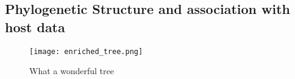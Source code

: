 \subsection*{Phylogenetic Structure and association with host data}
\graphicspath{{images/phylogeneticStructureHostData/}}





\begin{figure}[h]	%
    \centering
    \texttt{[image: enriched\_tree.png]}
    \caption{What a wonderful tree}
    \label{fig:tree_metadata}    
\end{figure}


